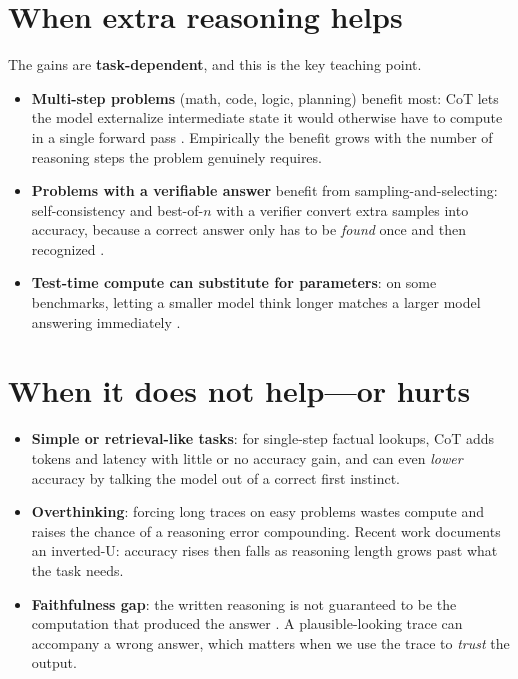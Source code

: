 \documentclass[11pt]{article}
\begin{document}
\section{When extra reasoning helps}
The gains are \textbf{task-dependent}, and this is the key teaching point.
\begin{itemize}[leftmargin=1.4em]
\item \textbf{Multi-step problems} (math, code, logic, planning) benefit most: CoT lets the model
externalize intermediate state it would otherwise have to compute in a single forward pass
\citep{wei2022cot}. Empirically the benefit grows with the number of reasoning steps the problem
genuinely requires.
\item \textbf{Problems with a verifiable answer} benefit from sampling-and-selecting: self-consistency
and best-of-$n$ with a verifier convert extra samples into accuracy, because a correct answer only has
to be \emph{found} once and then recognized \citep{wang2023selfconsistency,cobbe2021verifiers}.
\item \textbf{Test-time compute can substitute for parameters}: on some benchmarks, letting a smaller
model think longer matches a larger model answering immediately \citep{snell2024scaling}.
\end{itemize}

\section{When it does not help---or hurts}
\begin{itemize}[leftmargin=1.4em]
\item \textbf{Simple or retrieval-like tasks}: for single-step factual lookups, CoT adds tokens and
latency with little or no accuracy gain, and can even \emph{lower} accuracy by talking the model out of
a correct first instinct.
\item \textbf{Overthinking}: forcing long traces on easy problems wastes compute and raises the chance
of a reasoning error compounding. Recent work documents an inverted-U: accuracy rises then falls as
reasoning length grows past what the task needs.
\item \textbf{Faithfulness gap}: the written reasoning is not guaranteed to be the computation that
produced the answer \citep{turpin2023faithfulness}. A plausible-looking trace can accompany a wrong
answer, which matters when we use the trace to \emph{trust} the output.
\end{itemize}
\end{document}
